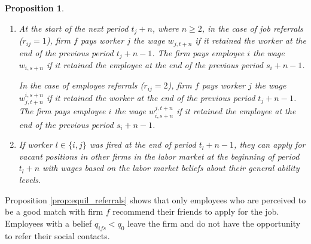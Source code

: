 \documentclass[12pt]{article}
\newtheorem{proposition}{Proposition}
\begin{document}
\begin{proposition}
\begin{enumerate}[label={\roman*})]
In the case of job referrals ($r_{ij} = 1$), the firm retains worker $j$ if its belief about worker $j$ being a good match with the firm satisfies $q_{j,t+n-1} \geq q_0$; the firm retains employee $i$ if its belief about worker $j$ being a good match with the firm satisfies $q_{i,s+n-1} \geq q_0$. The firm's profit from employing worker $j$ is equal to $\Pi_{j,f,t+n-1} = y_{j,f,t+n-1} - w_{j, t+n-1}$; the firm's profit from employing employee $i$ is equal to $\Pi_{i,f,s+n-1} = y_{i,f,s+n-1} - w_{i, s+n-1}$.

In the case of employee referrals ($r_{ij}=2$), the firm retains worker $j$ if its belief about worker $j$ being a good match with the firm satisfies $q_{j,t+n-1}^{i,s+n-1} \geq q_0$; the firm retains worker $i$ if its belief about employee $i$ being a good match with the firm satisfies $q_{i,s+n-1}^{j,t+n-1} \geq q_0$. The firm's profit from employing worker $j$ is equal to $\Pi_{j,f,t+n-1}^{i,f,s+n-1} = y_{j,f,t+n-1} - w_{j, t+n-1}^{i,s+n-1}$; the firm's profit from employing employee $i$ is equal to $\Pi_{i,f,s+n-1}^{j,f,t+n-1} = y_{i,f,s+n-1} - w_{i, s+n-1}^{j,t+n-1}$.

\item At the start of the next period $t_j + n$, where $n \geq 2$, in the case of job referrals ($r_{ij} = 1$), firm $f$ pays worker $j$ the wage $w_{j,t+n}$ if it retained the worker at the end of the previous period $t_j+n-1$. The firm pays employee $i$ the wage $w_{i,s+n}$ if it retained the employee at the end of the previous period $s_i+n-1$.

In the case of employee referrals ($r_{ij} = 2$), firm $f$ pays worker $j$ the wage $w_{j,t+n}^{i,s+n}$ if it retained the worker at the end of the previous period $t_j+n-1$. The firm pays employee $i$ the wage $w_{i,s+n}^{j,t+n}$ if it retained the employee at the end of the previous period $s_i+n-1$.

\item If worker $l \in \lbrace i,j \rbrace$ was fired at the end of period $t_l+n-1$, they can apply for vacant positions in other firms in the labor market at the beginning of period $t_l+n$ with wages based on the labor market beliefs about their general ability levels.

\end{enumerate}
\end{proposition}

Proposition \ref{prop:equil_referrals} shows that only employees who are perceived to be a good match with firm $f$ recommend their friends to apply for the job. Employees with a belief $q_{ifs} < q_0$ leave the firm and do not have the opportunity to refer their social contacts.
\end{document}
